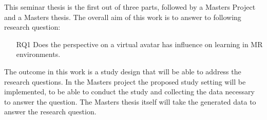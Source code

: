 This seminar thesis is the first out of three parts, followed by a Masters Project and a Masters thesis. The overall aim of this work is to answer to following research question:
\begin{itemize}
	\item[RQ1] Does the perspective on a virtual avatar has influence on learning in MR environments.
\end{itemize}
The outcome in this work is a study design that will be able to address the research questions. In the Masters project the proposed study setting will be implemented, to be able to conduct the study and collecting the data necessary to answer the question. The Masters thesis itself will take the generated data to answer the research question.


